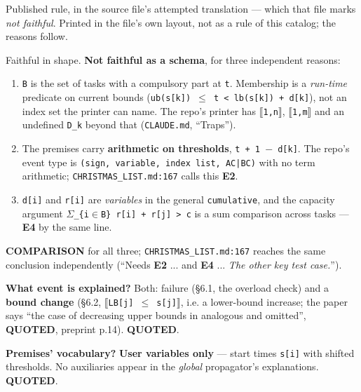 \documentclass[10pt,a4paper]{article}
\newcommand{\provtag}[2]{{\small\sffamily\bfseries\textcolor{#1}{#2}}}
\newenvironment{pubblock}{%
  \par\smallskip
  \def\FrameCommand{\textcolor{litbar}{\vrule width 2.5pt}\hspace{9pt}}%
  \MakeFramed{\advance\hsize-\width\FrameRestore}}%
  {\endMakeFramed\par\smallskip}
\newcommand{\litsub}[1]{\par\smallskip{\sffamily\bfseries\textcolor{litbar}{#1}\par}}
\newcommand{\rulekind}[1]{\par{\small\sffamily\textcolor{litbar}{#1}\par}}
\newcommand{\litline}[1]{\noindent
  \resizebox{\ifdim\width>\linewidth\linewidth\else\width\fi}{!}{#1}\par}
\begin{document}
\begin{pubblock}
\rulekind{Published rule, in the source file's attempted translation --- which that file marks \emph{not faithful}. Printed in the file's own layout, not as a rule of this catalog; the reasons follow.}
{\raggedright
\litline{\ttfamily\small S\_j $\geq$ t+1$-$d\_j,~~~S\_k $\geq$ t+1$-$d\_k,~~~S\_k $\leq$ t,~~~$\forall$k $\in$ B}
\litline{\ttfamily\small ------------------------------------------------- $\vdash$~~~~~~~~(BC)}
\litline{\ttfamily\small S\_j $\geq$ t+1}
\par}
Faithful in shape. \textbf{Not faithful as a schema}, for three independent reasons:

\begin{enumerate}\setlength{\itemsep}{0pt}
\item \texttt{B} is the set of tasks with a compulsory part at \texttt{t}. Membership is a \emph{run-time} predicate on current bounds (\texttt{ub(s[k]) $\leq$ t < lb(s[k]) + d[k]}), not an index set the printer can name. The repo's printer has \texttt{$\llbracket$1,n$\rrbracket$}, \texttt{$\llbracket$1,m$\rrbracket$} and an undefined \texttt{D\_k} beyond that (\texttt{CLAUDE.md}, ``Traps'').
\item The premises carry \textbf{arithmetic on thresholds}, \texttt{t + 1 $-$ d[k]}. The repo's event type is \texttt{(sign, variable, index list, AC|BC)} with no term arithmetic; \texttt{CHRISTMAS\_LIST.md:167} calls this \textbf{E2}.
\item \texttt{d[i]} and \texttt{r[i]} are \emph{variables} in the general \texttt{cumulative}, and the capacity argument \texttt{$\Sigma$\_\{i$\in$B\} r[i] + r[j] > c} is a sum comparison across tasks --- \textbf{E4} by the same line.
\end{enumerate}
\provtag{tagcomparison}{COMPARISON} for all three; \texttt{CHRISTMAS\_LIST.md:167} reaches the same conclusion independently (``Needs \textbf{E2} ... and \textbf{E4} ... \emph{The other key test case.}'').

\par\smallskip
\litsub{Answers to the four catalog questions}
\textbf{What event is explained?} Both: failure (\S{}6.1, the overload check) and a \textbf{bound change} (\S{}6.2, \texttt{$\llbracket$LB[j] $\leq$ s[j]$\rrbracket$}, i.e. a lower-bound increase; the paper says ``the case of decreasing upper bounds in analogous and omitted'', \provtag{tagquoted}{QUOTED}, preprint p.14). \provtag{tagquoted}{QUOTED}.

\textbf{Premises' vocabulary?} \textbf{User variables only} --- start times \texttt{s[i]} with shifted thresholds. No auxiliaries appear in the \emph{global} propagator's explanations. \provtag{tagquoted}{QUOTED}.


\end{pubblock}
\end{document}
